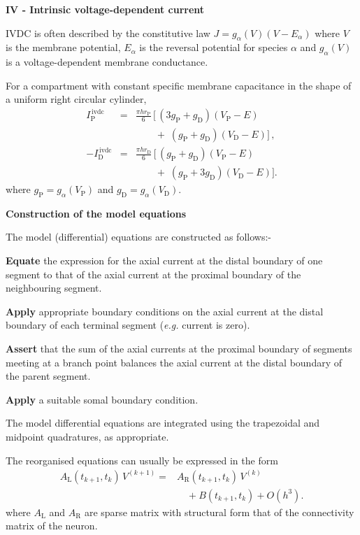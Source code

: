 \documentclass{slides}
\def\ds{\displaystyle}
\begin{document}
%
%
\begin{slide}
\begin{center}
\textbf{IV - Intrinsic voltage-dependent current}
\end{center}
IVDC is often described by the constitutive law
$J=g_\alpha(V)(V-E_\alpha)$ where $V$ is the membrane potential,
$E_\alpha$ is the reversal potential for species $\alpha$ and
$g_\alpha(V)$ is a voltage-dependent membrane conductance.

For a compartment with constant specific membrane capacitance in the
shape of a uniform right circular cylinder,
\[
\begin{array}{rcl}
I^\mathrm{\,ivdc}_\mathrm{P} & = & \ds\frac{\pi h r_\mathrm{P}}{6}
\,\Bigg[\,(3g_\mathrm{P}+g_\mathrm{D})(V_\mathrm{P}-E)\\[10pt]
&&\ds\qquad+\;(g_\mathrm{P}+g_\mathrm{D})(V_\mathrm{D}-E)\Bigg]\,,\\[20pt]
-I^\mathrm{\,ivdc}_\mathrm{D} & = & \ds\frac{\pi h r_\mathrm{D}}{6}
\,\Bigg[\,(g_\mathrm{P}+g_\mathrm{D})(V_\mathrm{P}-E)\\[10pt]
&&\qquad+\;(g_\mathrm{P}+3g_\mathrm{D})(V_\mathrm{D}-E)\Bigg].
\end{array}
\]
where $g_\mathrm{P}=g_\alpha(V_\mathrm{P})$ and $g_\mathrm{D}=g_\alpha(
V_\mathrm{D})$.
\end{slide}

%
%
\begin{slide}
\begin{center}
\textbf{Construction of the model equations}
\end{center}
The model (differential) equations are constructed as follows:-

\textbf{Equate} the expression for the axial current at the
distal boundary of one segment to that of the axial current
at the proximal boundary of the neighbouring segment.

\textbf{Apply} appropriate boundary conditions on the axial
current at the distal boundary of each terminal segment
(\emph{e.g.} current is zero).

\textbf{Assert} that the sum of the axial currents at the proximal
boundary of segments meeting at a branch point balances the axial
current at the distal boundary of the parent segment.

\textbf{Apply} a suitable somal boundary condition.
\end{slide}

%
%
\begin{slide}
The model differential equations are integrated using the
trapezoidal and midpoint quadratures, as appropriate.

The reorganised equations can usually be expressed in the form
\[
\begin{array}{ll}
\ds A_\mathrm{L}(t_{k+1},t_k)\,V^{(k+1)} = &
A_\mathrm{R}(t_{k+1},t_k)\,V^{(k)}\\[10pt]
&\quad+B(t_{k+1},t_k)+O(h^3).
\end{array}
\]
where $A_\mathrm{L}$ and $A_\mathrm{R}$ are sparse matrix with
structural form that of the connectivity matrix of the neuron.
\end{slide}
\end{document}
